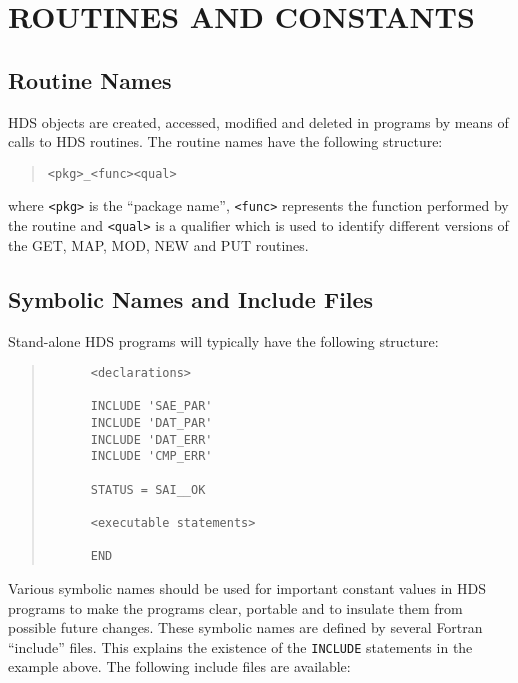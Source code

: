 \documentclass[twoside,11pt]{article}
\newcommand{\htmlref}[2]{#1}
\newcommand{\xlabel}[1]{}
\renewcommand{\_}{\texttt{\symbol{95}}}
\newcommand{\hi}[1]{{\tt{#1}}}
\newcommand{\qt}[1]{``#1''}
\newcommand{\qt}[1]{{\tt{"}}#1{\tt{"}}}
\begin{document}
\section{\xlabel{routines_and_constants}ROUTINES AND CONSTANTS}

\subsection{Routine Names}

HDS objects are created, accessed, modified and deleted in programs by
means of calls to HDS \htmlref{routines}{appendix:alphalist}. The
routine names have the following structure:

\small
\begin{quote}
\begin{verbatim}
<pkg>_<func><qual>
\end{verbatim}
\end{quote}
\normalsize

where \verb+<pkg>+ is the \qt{package name}, \verb+<func>+ represents
the function performed by the routine and \verb+<qual>+ is a qualifier
which is used to identify different versions of the GET, MAP, MOD, NEW
and PUT routines.

\subsection{Symbolic Names and Include Files}

Stand-alone HDS programs will typically have the following structure:

\small
\begin{quote}
\begin{verbatim}
      <declarations>

      INCLUDE 'SAE_PAR'
      INCLUDE 'DAT_PAR'
      INCLUDE 'DAT_ERR'
      INCLUDE 'CMP_ERR'

      STATUS = SAI__OK

      <executable statements>

      END
\end{verbatim}
\end{quote}
\normalsize

Various symbolic names should be used for important constant values in
HDS programs to make the programs clear, portable and to insulate them
from possible future changes. These symbolic names are defined by
several Fortran \qt{include} files.  This explains the existence of
the \hi{INCLUDE} statements in the example above. The following
include files are available:
\end{document}
